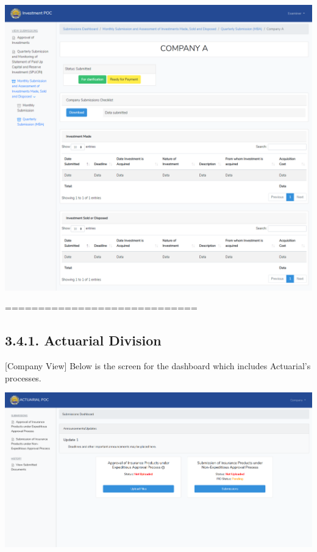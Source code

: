 \documentclass{article}
\begin{document}
\includegraphics[keepaspectratio=true]{up-ic-screens/image185}{}%

=============================%

\subsection{3.4.\hspace*{0.5em}1.  Actuarial Division}\label{sec-1-actuarial-division}%

\noindent{}[Company View] Below is the screen for the dashboard
which includes Actuarial’s processes.%

\includegraphics[keepaspectratio=true]{up-ic-screens/image151}{}%
\end{document}
